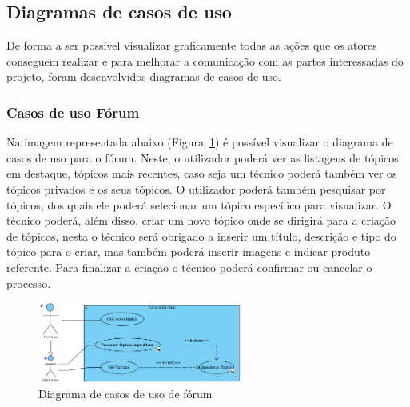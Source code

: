 
\subsection{Diagramas de casos de uso}
De forma a ser possível visualizar graficamente todas as ações que os 
atores conseguem realizar e para melhorar a comunicação com as 
partes interessadas do projeto, foram desenvolvidos diagramas de 
casos de uso.

\subsubsection{Casos de uso Fórum}
Na imagem representada abaixo (Figura~\ref{fig:9}) é possível 
visualizar o diagrama de casos de uso para o fórum.
Neste, o utilizador poderá ver as listagens de tópicos em destaque, tópicos mais recentes, caso seja um 
técnico poderá também ver os tópicos privados e os seus tópicos. 
O utilizador poderá também pesquisar por tópicos,  dos quais ele poderá selecionar um tópico 
específico para visualizar. 
O técnico poderá, além disso, criar um novo tópico onde se dirigirá para a criação de tópicos,
nesta o técnico será obrigado a inserir um título, descrição e tipo do tópico para o criar, 
mas também poderá inserir imagens e indicar produto referente.
Para finalizar a criação o técnico poderá confirmar ou cancelar o processo. 

\begin{figure}[htb]
    \centering
    \includegraphics[width=0.6\textwidth]{images/diagramas/casos_de_uso/use_case_forum.png}
    \caption{Diagrama de casos de uso de fórum}
    \label{fig:9}
\end{figure}



